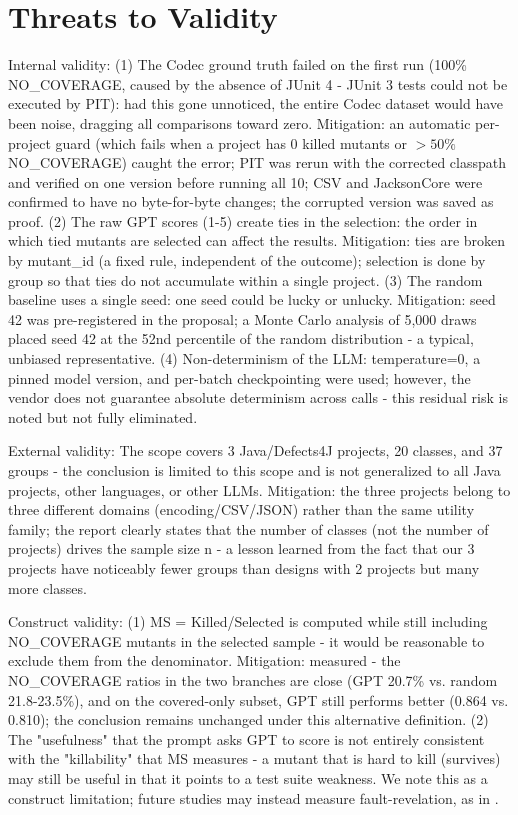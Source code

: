 \section{Threats to Validity}
Internal validity: (1) The Codec ground truth failed on the first run (100\% NO\_COVERAGE, caused by the absence of JUnit 4 - JUnit 3 tests could not be executed by PIT): had this gone unnoticed, the entire Codec dataset would have been noise, dragging all comparisons toward zero. Mitigation: an automatic per-project guard (which fails when a project has 0 killed mutants or $>50\%$ NO\_COVERAGE) caught the error; PIT was rerun with the corrected classpath and verified on one version before running all 10; CSV and JacksonCore were confirmed to have no byte-for-byte changes; the corrupted version was saved as proof. (2) The raw GPT scores (1-5) create ties in the selection: the order in which tied mutants are selected can affect the results. Mitigation: ties are broken by mutant\_id (a fixed rule, independent of the outcome); selection is done by group so that ties do not accumulate within a single project. (3) The random baseline uses a single seed: one seed could be lucky or unlucky. Mitigation: seed 42 was pre-registered in the proposal; a Monte Carlo analysis of 5,000 draws placed seed 42 at the 52nd percentile of the random distribution - a typical, unbiased representative. (4) Non-determinism of the LLM: temperature=0, a pinned model version, and per-batch checkpointing were used; however, the vendor does not guarantee absolute determinism across calls - this residual risk is noted but not fully eliminated.

External validity: The scope covers 3 Java/Defects4J projects, 20 classes, and 37 groups - the conclusion is limited to this scope and is not generalized to all Java projects, other languages, or other LLMs. Mitigation: the three projects belong to three different domains (encoding/CSV/JSON) rather than the same utility family; the report clearly states that the number of classes (not the number of projects) drives the sample size n - a lesson learned from the fact that our 3 projects have noticeably fewer groups than designs with 2 projects but many more classes.

Construct validity: (1) MS = Killed/Selected is computed while still including NO\_COVERAGE mutants in the selected sample - it would be reasonable to exclude them from the denominator. Mitigation: measured - the NO\_COVERAGE ratios in the two branches are close (GPT 20.7\% vs. random 21.8-23.5\%), and on the covered-only subset, GPT still performs better (0.864 vs. 0.810); the conclusion remains unchanged under this alternative definition. (2) The "usefulness" that the prompt asks GPT to score is not entirely consistent with the "killability" that MS measures - a mutant that is hard to kill (survives) may still be useful in that it points to a test suite weakness. We note this as a construct limitation; future studies may instead measure fault-revelation, as in \cite{jimenez2018naturalness}.

